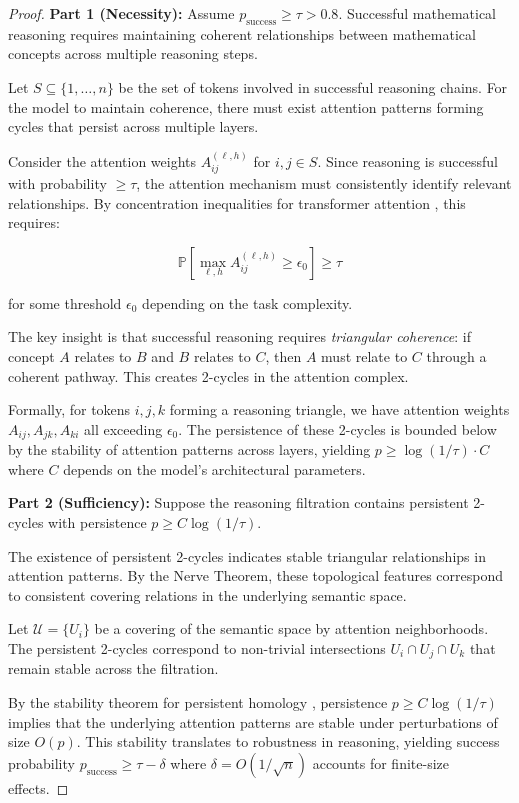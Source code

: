 \documentclass[11pt,a4paper]{article}
\begin{document}
\begin{proof}
\textbf{Part 1 (Necessity):} Assume $p_{\text{success}} \geq \tau > 0.8$. Successful mathematical reasoning requires maintaining coherent relationships between mathematical concepts across multiple reasoning steps. 

Let $S \subseteq \{1, \ldots, n\}$ be the set of tokens involved in successful reasoning chains. For the model to maintain coherence, there must exist attention patterns forming cycles that persist across multiple layers.

Consider the attention weights $A^{(\ell,h)}_{ij}$ for $i,j \in S$. Since reasoning is successful with probability $\geq \tau$, the attention mechanism must consistently identify relevant relationships. By concentration inequalities for transformer attention \cite{vaswani2017}, this requires:

$$\mathbb{P}\left[\max_{\ell,h} A^{(\ell,h)}_{ij} \geq \epsilon_0\right] \geq \tau$$

for some threshold $\epsilon_0$ depending on the task complexity.

The key insight is that successful reasoning requires \textit{triangular coherence}: if concept $A$ relates to $B$ and $B$ relates to $C$, then $A$ must relate to $C$ through a coherent pathway. This creates 2-cycles in the attention complex.

Formally, for tokens $i,j,k$ forming a reasoning triangle, we have attention weights $A_{ij}, A_{jk}, A_{ki}$ all exceeding $\epsilon_0$. The persistence of these 2-cycles is bounded below by the stability of attention patterns across layers, yielding $p \geq \log(1/\tau) \cdot C$ where $C$ depends on the model's architectural parameters.

\textbf{Part 2 (Sufficiency):} Suppose the reasoning filtration contains persistent 2-cycles with persistence $p \geq C \log(1/\tau)$. 

The existence of persistent 2-cycles indicates stable triangular relationships in attention patterns. By the Nerve Theorem, these topological features correspond to consistent covering relations in the underlying semantic space.

Let $\mathcal{U} = \{U_i\}$ be a covering of the semantic space by attention neighborhoods. The persistent 2-cycles correspond to non-trivial intersections $U_i \cap U_j \cap U_k$ that remain stable across the filtration.

By the stability theorem for persistent homology \cite{edelsbrunner2008}, persistence $p \geq C \log(1/\tau)$ implies that the underlying attention patterns are stable under perturbations of size $O(p)$. This stability translates to robustness in reasoning, yielding success probability $p_{\text{success}} \geq \tau - \delta$ where $\delta = O(1/\sqrt{n})$ accounts for finite-size effects.
\end{proof}
\end{document}
